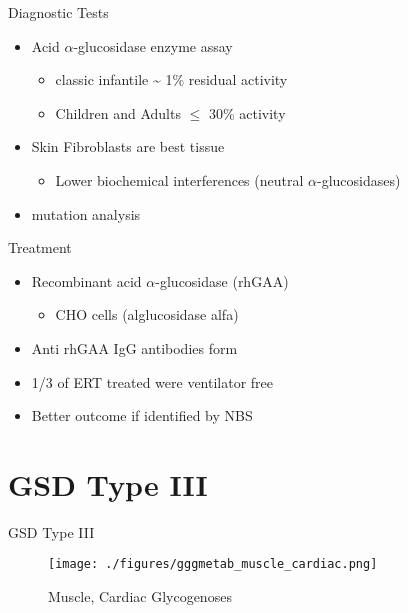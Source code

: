 \documentclass[presentation, smaller]{beamer}
\begin{document}
\begin{frame}[label={sec:org2fb24c3}]{Diagnostic Tests}
\begin{itemize}
\item Acid \(\alpha\)-glucosidase enzyme assay
\begin{itemize}
\item classic infantile \textasciitilde{} 1\% residual activity
\item Children and Adults \(\le\) 30\% activity
\end{itemize}
\item Skin Fibroblasts are best tissue
\begin{itemize}
\item Lower biochemical interferences (neutral \(\alpha\)-glucosidases)
\end{itemize}
\item mutation analysis
\end{itemize}
\end{frame}
\begin{frame}[label={sec:org808c450}]{Treatment}
\begin{itemize}
\item Recombinant acid \(\alpha\)-glucosidase (rhGAA)
\begin{itemize}
\item CHO cells (alglucosidase alfa)
\end{itemize}
\item Anti rhGAA IgG antibodies form
\item 1/3 of ERT treated were ventilator free
\item Better outcome if identified by NBS
\end{itemize}
\end{frame}

\section{GSD Type III}
\label{sec:org0664e2e}
\begin{frame}[label={sec:org051d1e1}]{GSD Type III}
\begin{figure}[htbp]
\centering
\texttt{[image: ./figures/gggmetab\_muscle\_cardiac.png]}
\caption[Muscle, Cardiac Glycogenoses]{\label{fig:org77ebf82}
Muscle, Cardiac Glycogenoses}
\end{figure}
\end{frame}
\end{document}
